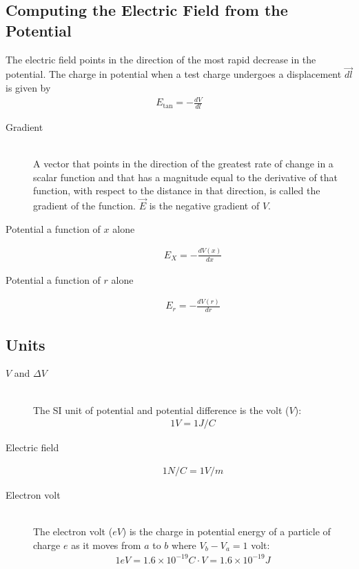 \documentclass[../main.tex]{subfiles}
\begin{document}
\subsection{Computing the Electric Field from the Potential}
\label{sub:computing_the_electric_field_from_the_potential}

The electric field points in the direction of the most rapid decrease in the
potential. The charge in potential when a test charge undergoes a displacement
$\vec{dl}$ is given by
\begin{align}
  E_{\text{tan}} = -\frac{dV}{dl}
\end{align}

\begin{description}
  \item[Gradient] \hfill \\
    A vector that points in the direction of the greatest rate of change in a
    scalar function and that has a magnitude equal to the derivative of that
    function, with respect to the distance in that direction, is called the
    gradient of the function. $\vec{E}$ is the negative gradient of $V$.
  \item[Potential a function of $x$ alone]
    \begin{align}
      E_X = -\frac{dV(x)}{dx}
    \end{align}
  \item[Potential a function of $r$ alone]
    \begin{align}
      E_r = -\frac{dV(r)}{dr}
    \end{align}
\end{description}

\subsection{Units}
\label{sub:units}

\begin{description}
  \item[$V$ and $\Delta V$] \hfill \\
    The SI unit of potential and potential difference is the volt ($V$):
    \begin{align}
      1V = 1J/C
    \end{align}
  \item[Electric field]
    \begin{align}
       1N/C = 1V/m
    \end{align}
  \item[Electron volt] \hfill \\
    The electron volt ($eV$) is the charge in potential energy of a particle of
    charge $e$ as it moves from $a$ to $b$ where $V_b - V_a = 1$ volt:
    \begin{align}
      1eV = 1.6\times10^{-19}C\cdot V=1.6\times10^{-19}J
    \end{align}
\end{description}
\end{document}
